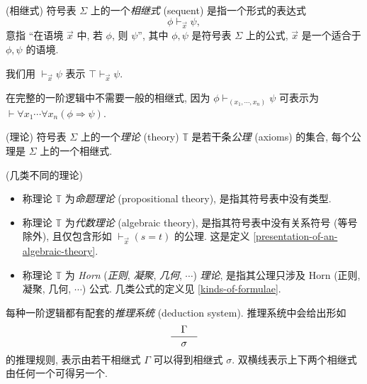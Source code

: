 
\begin{definition}
	[label={sequents}]
	{(相继式)}
	符号表 $\Sigma$ 上的一个\emph{相继式} (sequent) 是指一个形式的表达式
	$$
	\phi \vdash_{\vec x} \psi,
	$$
	意指 ``在语境 $\vec x$ 中, 若 $\phi$, 则 $\psi$'', 其中 $\phi,\psi$ 是符号表 $\Sigma$ 上的公式,
	$\vec x$ 是一个适合于 $\phi,\psi$ 的语境.
	
	我们用 $\vdash_{\vec x} \psi$ 表示 $\top\vdash_{\vec x} \psi$.
\end{definition}

\begin{remark}
	[label={remark-full-first-order-logic-no-need-sequents}]
	{}
	在完整的一阶逻辑中不需要一般的相继式, 因为
	$\phi \vdash_{(x_1,\cdots,x_n)} \psi$ 可表示为
	$\vdash \forall x_1\cdots \forall x_n (\phi\Rightarrow \psi)$.
\end{remark}

\begin{definition}
	[label={theory-on-signature}]
	{(理论)}
	符号表 $\Sigma$ 上的一个\emph{理论} (theory) $\mathbb T$ 是若干条\emph{公理} (axioms) 的集合, 每个公理是 $\Sigma$ 上的一个相继式.
\end{definition}

\begin{definition}
	[label={kinds-of-theories}]
	{(几类不同的理论)}
	\begin{itemize}
		\item 称理论 $\mathbb T$ 为\emph{命题理论} (propositional theory), 是指其符号表中没有类型.
		\item 称理论 $\mathbb T$ 为\emph{代数理论} (algebraic theory), 是指其符号表中没有关系符号 (等号除外), 且仅包含形如 $\vdash_{\vec x} (s=t)$ 的公理. 这是定义 \ref{presentation-of-an-algebraic-theory}.
		\item 称理论 $\mathbb T$ 为 \emph{Horn} (\emph{正则}, \emph{凝聚}, \emph{几何}, $\cdots$) \emph{理论}, 是指其公理只涉及 Horn (正则, 凝聚, 几何, $\cdots$) 公式. 几类公式的定义见 \ref{kinds-of-formulae}.
	\end{itemize}
\end{definition}




每种一阶逻辑都有配套的\emph{推理系统} (deduction system). 推理系统中会给出形如
$$
\dfrac{\quad \Gamma \quad}{\quad \sigma \quad}
$$
的推理规则, 表示由若干相继式 $\Gamma$ 可以得到相继式 $\sigma$.
双横线表示上下两个相继式由任何一个可得另一个.

